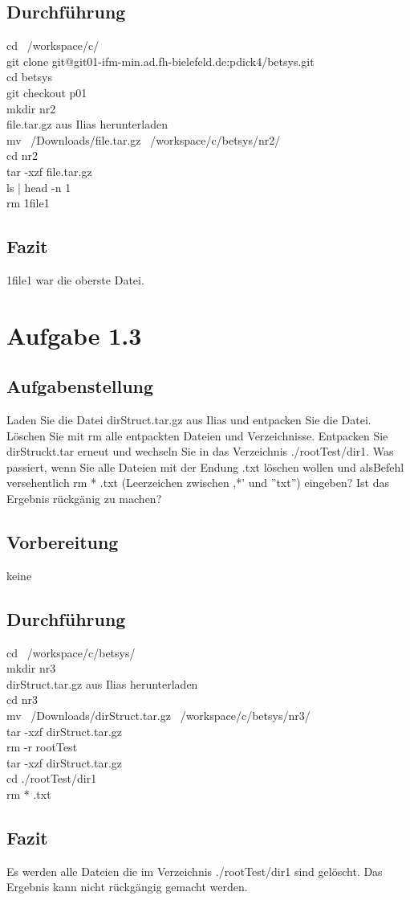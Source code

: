 	\subsection{Durchführung}
		cd ~/workspace/c/\\
		git clone git@git01-ifm-min.ad.fh-bielefeld.de:pdick4/betsys.git\\
		cd betsys\\
		git checkout p01\\
		mkdir nr2\\
		file.tar.gz aus Ilias herunterladen\\
		mv ~/Downloads/file.tar.gz ~/workspace/c/betsys/nr2/\\
		cd nr2\\
		tar -xzf file.tar.gz\\
		ls | head -n 1\\
		rm 1file1\\
	\subsection{Fazit}
		1file1 war die oberste Datei.
\section{Aufgabe 1.3}
\subsection{Aufgabenstellung}
	Laden Sie die Datei dirStruct.tar.gz aus Ilias und entpacken Sie die Datei. L\"oschen Sie mit rm alle entpackten Dateien und Verzeichnisse. Entpacken Sie dirStruckt.tar erneut und wechseln Sie in das Verzeichnis ./rootTest/dir1. Was passiert, wenn Sie alle Dateien mit der Endung .txt l\"oschen wollen und alsBefehl versehentlich rm * .txt (Leerzeichen zwischen ,*' und ''txt'') eingeben? Ist das Ergebnis r\"uckg\"anig zu machen?
\subsection{Vorbereitung}
	keine
\subsection{Durchführung}
	cd ~/workspace/c/betsys/\\
	mkdir nr3\\
	dirStruct.tar.gz aus Ilias herunterladen\\
	cd nr3\\
	mv ~/Downloads/dirStruct.tar.gz ~/workspace/c/betsys/nr3/\\
	tar -xzf dirStruct.tar.gz\\
	rm -r rootTest\\
	tar -xzf dirStruct.tar.gz\\
	cd ./rootTest/dir1\\
	rm * .txt\\
\subsection{Fazit}
	Es werden alle Dateien die im Verzeichnis ./rootTest/dir1 sind gel\"oscht. Das Ergebnis kann nicht r\"uckg\"angig gemacht werden.